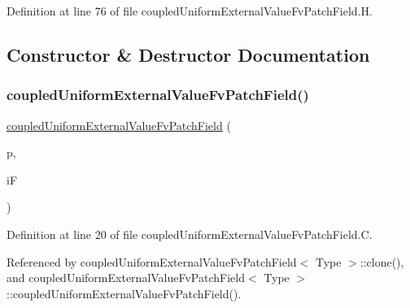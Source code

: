 Definition at line 76 of file coupled\+Uniform\+External\+Value\+Fv\+Patch\+Field.\+H.



\subsection{Constructor \& Destructor Documentation}
\mbox{\label{classFoam_1_1coupledUniformExternalValueFvPatchField_a845efa0d3f4d6764c6feb43b38033a8f}} 
\subsubsection{\texorpdfstring{coupled\+Uniform\+External\+Value\+Fv\+Patch\+Field()}{coupledUniformExternalValueFvPatchField()}\hspace{0.1cm}{\footnotesize\ttfamily [1/6]}}
{\footnotesize\ttfamily \hyperlink{classFoam_1_1coupledUniformExternalValueFvPatchField}{coupled\+Uniform\+External\+Value\+Fv\+Patch\+Field} (\begin{DoxyParamCaption}\item[{const fv\+Patch \&}]{p,  }\item[{const Dimensioned\+Field$<$ Type, vol\+Mesh $>$ \&}]{iF }\end{DoxyParamCaption})}



Definition at line 20 of file coupled\+Uniform\+External\+Value\+Fv\+Patch\+Field.\+C.



Referenced by coupled\+Uniform\+External\+Value\+Fv\+Patch\+Field$<$ Type $>$\+::clone(), and coupled\+Uniform\+External\+Value\+Fv\+Patch\+Field$<$ Type $>$\+::coupled\+Uniform\+External\+Value\+Fv\+Patch\+Field().

